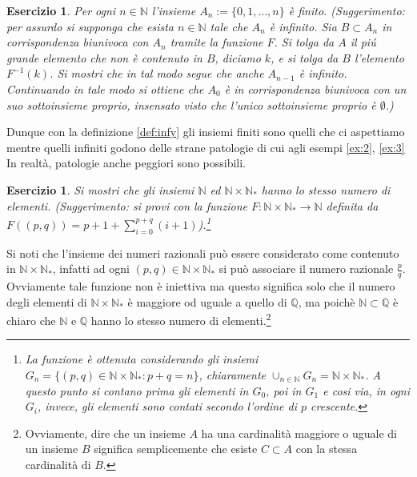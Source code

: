 \documentclass{amsart}
\newtheorem{es}[thm]{Esercizio}
\newcommand\N{{\mathbb N}}
\newcommand\Q{{\mathbb Q}}
\begin{document}
\begin{es}\label{es:finito}
Per ogni $n\in\N$ l'insieme $A_n:=\{0,1,\dots,n\}$ \`e
finito. (Suggerimento: per assurdo si supponga che esista $n\in \N$
tale che $A_n$ \`e infinito. Sia $B\subset A_n$ in corrispondenza
biunivoca con $A_n$ tramite la funzione $F$. Si tolga da $A$ il pi\'u
grande elemento che non \`e contenuto in $B$, diciamo $k$, e si tolga
da $B$ l'elemento $F^{-1}(k)$. Si mostri che in tal modo segue che anche
$A_{n-1}$ \`e infinito. Continuando in tale modo si ottiene che $A_0$
\`e in corrispondenza biunivoca con un suo sottoinsieme proprio,
insensato visto che l'unico sottoinsieme proprio \`e $\emptyset$.)
\end{es}
Dunque con la definizione \ref{def:infy} gli insiemi finiti sono
quelli che ci aspettiamo mentre quelli infiniti godono delle strane
patologie di cui agli esempi \ref{ex:2}, \ref{ex:3} 
In realt\`a, patologie anche peggiori sono possibili.
\begin{es}\label{es:raz} Si mostri che gli insiemi $\N$ ed $\N\times
\N_*$ hanno lo stesso numero di elementi. (Suggerimento: si provi con la funzione
$F:\N\times \N_*\to\N$ definita da
$F((p,q))=p+1+\sum_{i=0}^{p+q}(i+1)$).\footnote{La funzione \`e
ottenuta considerando gli insiemi $G_n=\{(p,q)\in\N\times \N_* :
p+q=n\}$, chiaramente $\cup_{n\in\N}G_n=\N\times \N_*$. A questo punto si contano
prima gli elementi in $G_0$, poi in $G_1$ e cosi via, in ogni $G_i$, invece,
gli elementi sono contati secondo l'ordine di $p$ crescente.}
\end{es}
Si noti che l'insieme dei numeri razionali pu\`o essere considerato
come contenuto in $\N\times \N_*$, infatti ad ogni $(p,q)\in\N\times
\N_*$ si pu\`o associare il numero razionale $\frac pq$. Ovviamente
tale funzione non \`e iniettiva ma questo significa solo che il numero
degli elementi di $\N\times \N_*$ \`e maggiore od uguale a quello di
$\Q$, ma poich\`e $\N\subset \Q$ \`e chiaro che $\N$ e $\Q$ hanno lo
stesso numero di elementi.\footnote{Ovviamente, dire che un insieme
$A$ ha una cardinalit\`a maggiore o uguale di un insieme $B$ significa
semplicemente che esiste $C\subset A$ con la stessa cardinalit\`a di $B$.}
\end{document}

